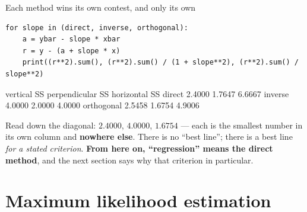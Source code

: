 \documentclass[aspectratio=169]{beamer}
\begin{document}
\begin{frame}[fragile,shrink=6]{Each method wins its own contest, and only its own}
\begin{lstlisting}
for slope in (direct, inverse, orthogonal):
    a = ybar - slope * xbar
    r = y - (a + slope * x)
    print((r**2).sum(), (r**2).sum() / (1 + slope**2), (r**2).sum() / slope**2)
\end{lstlisting}
\begin{outblk}
              vertical SS   perpendicular SS   horizontal SS
   direct        2.4000            1.7647          6.6667
   inverse       4.0000            2.0000          4.0000
   orthogonal    2.5458            1.6754          4.9006
\end{outblk}
\begin{center}\small
  Read down the diagonal: $2.4000$, $4.0000$, $1.6754$ --- each is the
  smallest number in its own column and \textbf{nowhere else}. There is no
  ``best line''; there is a best line \emph{for a stated criterion}.
  \textbf{From here on, ``regression'' means the direct method}, and the next
  section says why that criterion in particular.
\end{center}
\end{frame}

\section[MLE]{Maximum likelihood estimation}
\label{sec:mle}
\end{document}
